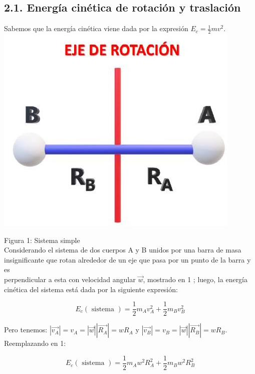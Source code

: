 \documentclass[10pt]{article}
\begin{document}
\subsection*{2.1. Energía cinética de rotación y traslación}
Sabemos que la energía cinética viene dada por la expresión $E_{c}=\frac{1}{2} m v^{2}$.\\
\includegraphics[scale = 0.15, center]{2025_04_01_ea720b93e8ebb5d0c6aeg-03}

Figura 1: Sistema simple\\
Considerando el sistema de dos cuerpos A y B unidos por una barra de masa insignificante que rotan alrededor de un eje que pasa por un punto de la barra y es\\
perpendicular a esta con velocidad angular $\vec{w}$, mostrado en 1 ; luego, la energía cinética del sistema está dada por la siguiente expresión:


\begin{equation*}
E_{c}(\text { sistema })=\frac{1}{2} m_{A} v_{A}^{2}+\frac{1}{2} m_{B} v_{B}^{2} \tag{1}
\end{equation*}


Pero tenemos: $\left|\overrightarrow{v_{A}}\right|=v_{A}=|\vec{w}|\left|\overrightarrow{R_{A}}\right|=w R_{A}$ y $\left|\overrightarrow{v_{B}}\right|=v_{B}=|\vec{w}|\left|\overrightarrow{R_{B}}\right|=w R_{B}$. Reemplazando en 1:


\begin{equation*}
E_{c}(\text { sistema })=\frac{1}{2} m_{A} w^{2} R_{A}^{2}+\frac{1}{2} m_{B} w^{2} R_{B}^{2} \tag{2}
\end{equation*}
\end{document}
